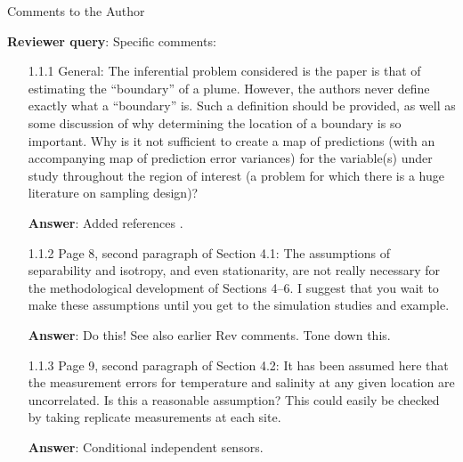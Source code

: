 \documentclass[a4paper]{article}
\def\reply{\textbf{Reviewer query}}
\def\action{\textbf{Answer}}
\begin{document}
\begin{answers}

\item{Comments to the Author}\label{ec}

\reply: Specific comments:

\begin{itemize}[noitemsep,topsep=0pt,parsep=0pt,partopsep=0pt]

\item[1.1.1]\label{ec1} General: The inferential problem considered is the paper is that of estimating the “boundary” of a plume. However, the authors never define exactly what a “boundary” is. Such a definition should be provided, as well as some discussion of why determining the location of a boundary is so important. Why is it not sufficient to create a map of predictions (with an accompanying map of prediction error variances) for the variable(s) under study throughout the region of interest (a problem for which there is a huge literature on sampling design)?\par
\action: Added references \cite{adler2000excursion,adler2009random}.

\vspace{1em}

\item[1.1.2]\label{ec2} Page 8, second paragraph of Section 4.1: The assumptions of separability and isotropy, and even stationarity, are not really necessary for the methodological development of Sections 4–6. I suggest that you wait to make these assumptions until you get to the simulation studies and example.\par
\action: Do this! See also earlier Rev comments. Tone down this.
\vspace{1em}

\item[1.1.3]\label{ec3} Page 9, second paragraph of Section 4.2: It has been assumed here that the measurement errors for temperature and salinity at any given location are uncorrelated. Is this a reasonable assumption? This could easily be checked by taking replicate measurements at each site.\par
\action: Conditional independent sensors. 
\vspace{1em}


\end{itemize}
\end{answers}
\end{document}
